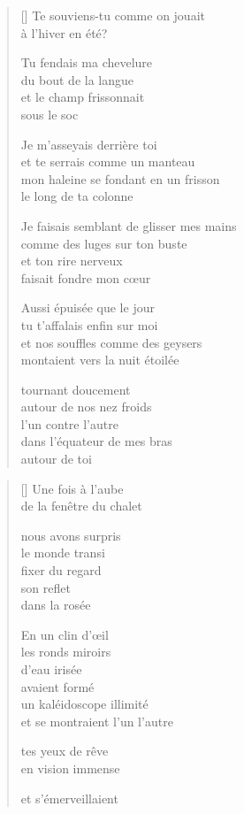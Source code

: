 \documentclass[12pt,a4paper]{article}
\begin{document}
\begin{verse}[\versewidth]
  Te souviens-tu comme on jouait \\
  à l'hiver en été?

  Tu fendais ma chevelure \\
  du bout de la langue \\
  et le champ frissonnait \\
  sous le soc

  Je m'asseyais derrière toi \\
  et te serrais comme un manteau \\
  mon haleine se fondant en un frisson \\
  le long de ta colonne

  Je faisais semblant de glisser mes mains \\
  comme des luges sur ton buste \\
  et ton rire nerveux \\
  faisait fondre mon cœur

  Aussi épuisée que le jour \\
  tu t'affalais enfin sur moi \\
  et nos souffles comme des geysers \\
  montaient vers la nuit étoilée

  tournant doucement \\
  autour de nos nez froids \\
  l'un contre l'autre \\
  dans l'équateur de mes bras \\
  autour de toi
\end{verse}


\newpage

\poemtitle{}

\settowidth{\versewidth}{et se montraient l'un l'autre}

\bigskip

\begin{verse}[\versewidth]
  Une fois à l'aube \\
  de la fenêtre du chalet

  nous avons surpris \\
  le monde transi \\
  fixer du regard \\
  son reflet \\
  dans la rosée

  En un clin d'œil \\
  les ronds miroirs \\
  d'eau irisée \\
  avaient formé \\
  un kaléidoscope illimité \\
  et se montraient l'un l'autre

  tes yeux de rêve \\
  en vision immense

  et s'émerveillaient
\end{verse}
\end{document}
